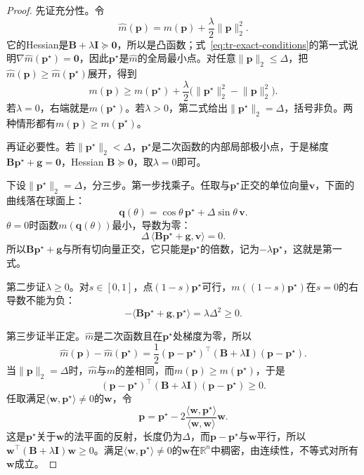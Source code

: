 \begin{proof}
 先证充分性。令
 \[
  \hat{m}(\bm{p})=m(\bm{p})+\frac{\lambda}{2}\lVert\bm{p}\rVert_2^2.
 \]
 它的Hessian是$\bm{B}+\lambda\bm{I}\succeq\bm{0}$，所以是凸函数；式~\eqref{eq:tr-exact-conditions}的第一式说明$\nabla\hat{m}(\bm{p}^\star)=\bm{0}$，因此$\bm{p}^\star$是$\hat{m}$的全局最小点。对任意$\lVert\bm{p}\rVert_2\leq\Delta$，把$\hat{m}(\bm{p})\geq\hat{m}(\bm{p}^\star)$展开，得到
 \[
  m(\bm{p})\geq m(\bm{p}^\star)+\frac{\lambda}{2}\bigl(\lVert\bm{p}^\star\rVert_2^2-\lVert\bm{p}\rVert_2^2\bigr).
 \]
 若$\lambda=0$，右端就是$m(\bm{p}^\star)$。若$\lambda>0$，第二式给出$\lVert\bm{p}^\star\rVert_2=\Delta$，括号非负。两种情形都有$m(\bm{p})\geq m(\bm{p}^\star)$。

 再证必要性。若$\lVert\bm{p}^\star\rVert_2<\Delta$，$\bm{p}^\star$是二次函数的内部局部极小点，于是梯度$\bm{B}\bm{p}^\star+\bm{g}=\bm{0}$，Hessian $\bm{B}\succeq\bm{0}$，取$\lambda=0$即可。

 下设$\lVert\bm{p}^\star\rVert_2=\Delta$，分三步。第一步找乘子。任取与$\bm{p}^\star$正交的单位向量$\bm{v}$，下面的曲线落在球面上：
 \[
  \bm{q}(\theta)=\cos\theta\,\bm{p}^\star+\Delta\sin\theta\,\bm{v}.
 \]
 $\theta=0$时函数$m(\bm{q}(\theta))$最小，导数为零：
 \[
  \Delta\,\langle\bm{B}\bm{p}^\star+\bm{g},\bm{v}\rangle=0.
 \]
 所以$\bm{B}\bm{p}^\star+\bm{g}$与所有切向量正交，它只能是$\bm{p}^\star$的倍数，记为$-\lambda\bm{p}^\star$，这就是第一式。

 第二步证$\lambda\geq0$。对$s\in[0,1]$，点$(1-s)\bm{p}^\star$可行，$m((1-s)\bm{p}^\star)$在$s=0$的右导数不能为负：
 \[
  -\langle\bm{B}\bm{p}^\star+\bm{g},\bm{p}^\star\rangle=\lambda\Delta^2\geq0.
 \]

 第三步证半正定。$\hat{m}$是二次函数且在$\bm{p}^\star$处梯度为零，所以
 \[
  \hat{m}(\bm{p})-\hat{m}(\bm{p}^\star)=\frac12(\bm{p}-\bm{p}^\star)^\top(\bm{B}+\lambda\bm{I})(\bm{p}-\bm{p}^\star).
 \]
 当$\lVert\bm{p}\rVert_2=\Delta$时，$\hat{m}$与$m$的差相同，而$m(\bm{p})\geq m(\bm{p}^\star)$，于是
 \[
  (\bm{p}-\bm{p}^\star)^\top(\bm{B}+\lambda\bm{I})(\bm{p}-\bm{p}^\star)\geq0.
 \]
 任取满足$\langle\bm{w},\bm{p}^\star\rangle\neq0$的$\bm{w}$，令
 \[
  \bm{p}=\bm{p}^\star-2\frac{\langle\bm{w},\bm{p}^\star\rangle}{\langle\bm{w},\bm{w}\rangle}\bm{w}.
 \]
 这是$\bm{p}^\star$关于$\bm{w}$的法平面的反射，长度仍为$\Delta$，而$\bm{p}-\bm{p}^\star$与$\bm{w}$平行，所以$\bm{w}^\top(\bm{B}+\lambda\bm{I})\bm{w}\geq0$。满足$\langle\bm{w},\bm{p}^\star\rangle\neq0$的$\bm{w}$在$\mathbb{R}^n$中稠密，由连续性，不等式对所有$\bm{w}$成立。
\end{proof}

